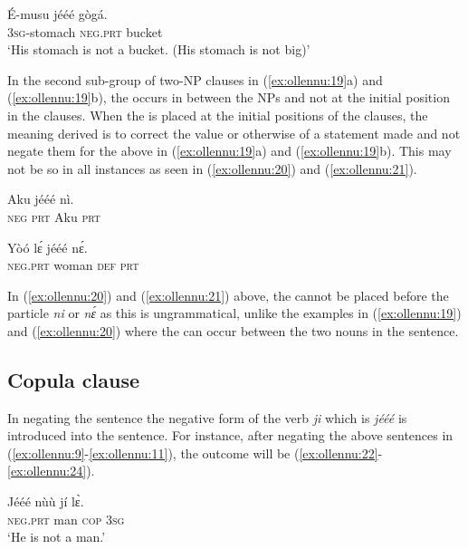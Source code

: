 \documentclass[output=paper
,newtxmath
,modfonts
,nonflat]{langsci/langscibook}
\begin{document}
\ea \label{ex:ollennu:51}
\gll \'E-musu j\'e\'e\'e g\`og\'a.\\
3\textsc{sg}-stomach \textsc{neg}.\textsc{prt} bucket\\
\glt 	`His stomach is not a bucket. (His stomach is not big)'
\z


In the second sub-group of two-NP clauses in (\ref{ex:ollennu:19}a) and (\ref{ex:ollennu:19}b), the  occurs in between the NPs and not at the initial position in the clauses. When the  is placed at the initial positions of the clauses, the meaning derived is to correct the value or otherwise of a statement made and not negate them for the above in (\ref{ex:ollennu:19}a) and (\ref{ex:ollennu:19}b). This may not be so in all instances as seen in (\ref{ex:ollennu:20}) and (\ref{ex:ollennu:21}).

\ea \label{ex:ollennu:20}
\gll * Aku j\'e\'e\'e n\`i. \\
{} \textsc{neg} \textsc{prt} Aku \textsc{prt}\\
\z

\ea \label{ex:ollennu:21}
\gll * Y\`o\'o l\'ɛ j\'e\'e\'e n\'ɛ.\\
{} \textsc{neg}.\textsc{prt} woman \textsc{def} \textsc{prt}\\
\z


In (\ref{ex:ollennu:20}) and (\ref{ex:ollennu:21}) above, the  cannot be placed before the particle \textit{ni} or \textit{n\'ɛ} as this is ungrammatical, unlike the examples in (\ref{ex:ollennu:19}) and (\ref{ex:ollennu:20}) where the  can occur between the two nouns in the sentence.

\subsection{\label{sec:ollennu:2.2} Copula clause}

In negating the  sentence the negative form of the  verb \textit{ji} which is \textit{j\'e\'e\'e} is introduced into the sentence. For instance, after negating the above  sentences in (\ref{ex:ollennu:9}-\ref{ex:ollennu:11}), the outcome will be (\ref{ex:ollennu:22}-\ref{ex:ollennu:24}).

\ea \label{ex:ollennu:22}
\gll J\'e\'e\'e n\`u\`u j\'i l\`ɛ.\\
\textsc{neg}.\textsc{prt} man \textsc{cop} 3\textsc{sg}\\
\glt `He is not a man.'
\z
\end{document}
